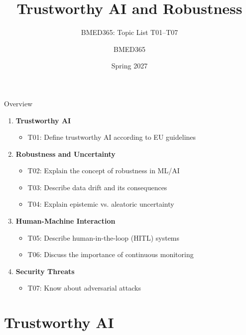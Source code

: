 \documentclass[aspectratio=169, 10pt]{beamer}
\title{Trustworthy AI and Robustness}
\subtitle{BMED365: Topic List T01--T07}
\author{BMED365}
\date{Spring 2027}
\begin{document}
\begin{frame}
    \titlepage
\end{frame}

\begin{frame}{Overview}
    \begin{enumerate}
        \item \textbf{Trustworthy AI}
        \begin{itemize}
            \item T01: Define trustworthy AI according to EU guidelines
        \end{itemize}
        \item \textbf{Robustness and Uncertainty}
        \begin{itemize}
            \item T02: Explain the concept of robustness in ML/AI
            \item T03: Describe data drift and its consequences
            \item T04: Explain epistemic vs. aleatoric uncertainty
        \end{itemize}
        \item \textbf{Human-Machine Interaction}
        \begin{itemize}
            \item T05: Describe human-in-the-loop (HITL) systems
            \item T06: Discuss the importance of continuous monitoring
        \end{itemize}
        \item \textbf{Security Threats}
        \begin{itemize}
            \item T07: Know about adversarial attacks
        \end{itemize}
    \end{enumerate}
\end{frame}

\section{Trustworthy AI}
\end{document}
